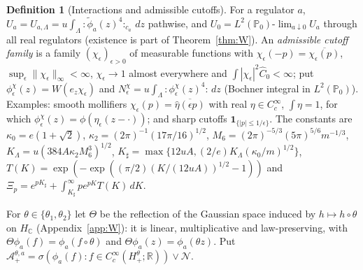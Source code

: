 \documentclass[11pt]{article}
\theoremstyle{plain}
\theoremstyle{definition}
\newtheorem{definition}[theorem]{Definition}
\theoremstyle{remark}
\newcommand{\R}{\mathbb{R}}
\newcommand{\C}{\mathbb{C}}
\newcommand{\PP}{\mathbb{P}}
\newcommand{\cN}{\mathcal{N}}
\newcommand{\cA}{\mathcal{A}}
\newcommand{\ind}{\mathbf{1}}
\newcommand{\conj}[1]{\overline{#1}}
\begin{document}
\begin{definition}[Interactions and admissible cutoffs]\label{def:W-objects}
For a regulator $a$, $U_a=U_{a,\Lambda}=u\int_\Lambda{:}\tilde\phi_a(z)^{4}{:}_{c_a}\,dz$
pathwise, and $U_0=L^{2}(\PP_0)\text{-}\lim_{a\downarrow0}U_a$ through all real regulators
(existence is part of Theorem~\ref{thm:W}). An \emph{admissible cutoff family} is a
family $(\chi_\epsilon)_{\epsilon>0}$ of measurable functions with
$\chi_\epsilon(-p)=\conj{\chi_\epsilon(p)}$, $\sup_\epsilon\|\chi_\epsilon\|_\infty<\infty$,
$\chi_\epsilon\to1$ almost everywhere and $\int|\chi_\epsilon|^{2}\hat C_0<\infty$; put
$\phi^{\chi}_\epsilon(z)=W(e_z\chi_\epsilon)$ and $N^{\chi}_\epsilon=u\int_\Lambda{:}\phi^{\chi}_\epsilon(z)^{4}{:}\,dz$
(Bochner integral in $L^{2}(\PP_0)$). Examples: smooth mollifiers
$\chi_\epsilon(p)=\conj{\hat\eta(\epsilon p)}$ with real $\eta\in C_c^{\infty}$, $\int\eta=1$, for
which $\phi^{\chi}_\epsilon(z)=\phi(\eta_\epsilon(z-\cdot))$; and sharp cutoffs
$\ind_{\{|p|\le1/\epsilon\}}$. The constants are
$\kappa_0=e(1+\sqrt2)$, $\kappa_2=(2\pi)^{-1}(17\pi/16)^{1/2}$,
$M_6=(2\pi)^{-5/3}(5\pi)^{5/6}m^{-1/3}$, $K_\Lambda=u(384A\kappa_2M_6^{3})^{1/2}$,
$K_\sharp=\max\{12uA,(2/e)K_\Lambda(\kappa_0/m)^{1/2}\}$,
$T(K)=\exp(-\exp((\pi/2)(K/(12uA))^{1/2}-1))$ and
$\Xi_p=e^{pK_\sharp}+\int_{K_\sharp}^{\infty}pe^{pK}T(K)\,dK$.
\end{definition}

For $\theta\in\{\theta_1,\theta_2\}$ let $\Theta$ be the reflection of the Gaussian space
induced by $h\mapsto h\circ\theta$ on $H_{\C}$ (Appendix~\ref{app:W}): it is linear,
multiplicative and law-preserving, with $\Theta\phi_a(f)=\phi_a(f\circ\theta)$ and
$\Theta\phi_a(z)=\phi_a(\theta z)$. Put
$\cA^{\theta,a}_{+}=\sigma(\phi_a(f):f\in C_c^{\infty}(H^{\theta}_{+};\R))\vee\cN$.
\end{document}
